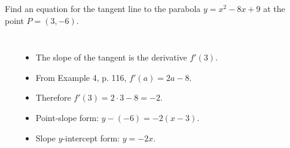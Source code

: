 \begin{frame}
\begin{example}[Example 5, p. 117]
Find an equation for the tangent line to the parabola $y = x^2 - 8x + 9$ at the point $P = (3,-6)$.

\begin{columns}[c]
\ %
%
\begin{itemize}
\item<2->  The slope of the tangent is the derivative $f'(3)$.
\item<3->  From Example 4, p. 116, $f'(a) = 2a-8$.
\item<4->  Therefore $f'(3) = 2\cdot 3 - 8 = -2$.
\item<5->  Point-slope form: $y - (-6) = -2(x-3)$.
\item<6->  Slope $y$-intercept form: $y = -2x$.
\end{itemize}
\end{columns}
\end{example}
\end{frame}
